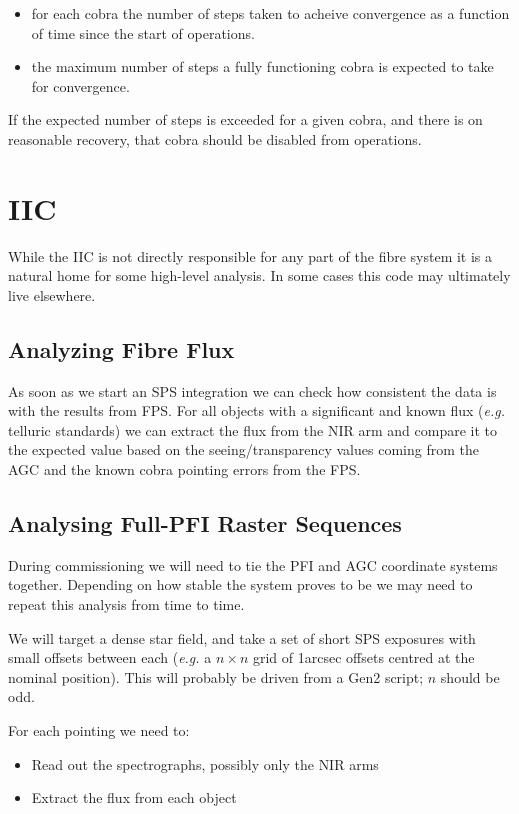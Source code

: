 \documentclass[12pt]{article}
\newcommand{\eg}{\textit{e.g.}\xspace}
\newcommand{\AGC}{\gls{AGC}\xspace}
\newcommand{\IIC}{\gls{IIC}\xspace}
\newcommand{\FPS}{\gls{FPS}\xspace}
\newcommand{\PFI}{\gls{PFI}\xspace}
\newcommand{\SPS}{\gls{SPS}\xspace}
\begin{document}
\begin{itemize}
\item for each cobra the number of steps taken to acheive convergence as
a function of time since the start of operations.
\item the maximum number of steps a fully functioning cobra is expected to take for convergence.
\end{itemize}

If the expected number of steps is exceeded for a given cobra, and there is on reasonable recovery, 
that cobra should be disabled from operations.


\section{IIC}
\label{sec:IIC}

While the \IIC is not directly responsible for any part of the fibre system it is a natural home
for some high-level analysis.  In some cases this code may ultimately live elsewhere.

\subsection{Analyzing Fibre Flux}

As soon as we start an \SPS integration we can check how consistent the data is with the
results from \FPS.  For all objects with a significant and known flux (\eg telluric standards) we
can extract the flux from the \gls{NIR} arm and compare it to the expected value based on the
seeing/transparency values coming from the \AGC and the known cobra pointing errors from the \FPS.

\subsection{Analysing Full-PFI Raster Sequences}

During commissioning we will need to tie the \PFI and \AGC coordinate systems together.   Depending
on how stable the system proves to be we may need to repeat this analysis from time to time.

We will target a dense star field, and take a set of short \SPS exposures with small offsets
between each (\eg a $n\times n$ grid of 1arcsec offsets centred at the nominal position).  This
will probably be driven from a \gls{Gen2} script; $n$ should be odd.

For each pointing we need to:
\begin{itemize}
\item Read out the spectrographs, possibly only the \gls{NIR} arms
\item Extract the flux from each object
\end{itemize}
\end{document}
